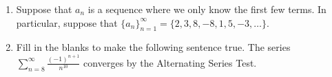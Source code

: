 \documentclass{article}
\begin{document}
\begin{enumerate}
\begin{alphenum}
        \end{alphenum}
        \item Suppose that $a_n$ is a sequence where we only know the first few terms.
        \nl In particular, suppose that
        $\{a_n\}_{n=1}^{\infty}=\{2,3,8,-8,1,5,-3,\ldots\}$.
       \item Fill in the blanks to make the following sentence true. 
       \nl The series $\sum\limits_{n=8}^{\infty}\frac{(-1)^{n+1}}{n^{10}}$ converges by the Alternating Series Test.

    \end{enumerate}
    
\end{document}
